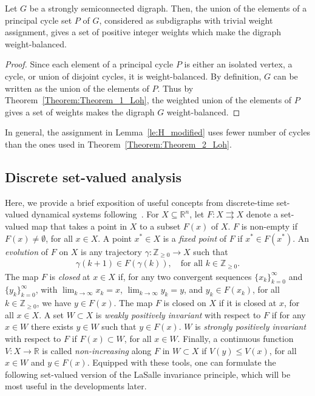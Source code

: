 \documentclass[final]{siamltex}
\begin{document}
\begin{lemma}\label{le:H_modified}
  Let $G$ be a strongly semiconnected digraph. Then, the union of the
  elements of a principal cycle set $P$ of $G$, considered as
  subdigraphs with trivial weight assignment, gives a set of positive
  integer weights which make the digraph weight-balanced.
\end{lemma}
\begin{proof}
  Since each element of a principal cycle $P$ is either an isolated
  vertex, a cycle, or union of disjoint cycles, it is
  weight-balanced. By definition, $G$ can be written as the union of
  the elements of $P$.  Thus by Theorem~\ref{Theorem:Theorem_1_Loh},
  the weighted union of the elements of $P$ gives a set of weights
  makes the digraph $G$ weight-balanced.
\end{proof}

In general, the assignment in Lemma~\ref{le:H_modified} uses fewer
number of cycles than the ones used in
Theorem~\ref{Theorem:Theorem_2_Loh}.

\subsection{Discrete set-valued analysis}

Here, we provide a brief exposition of useful concepts from
discrete-time set-valued dynamical systems
following~\cite{DGL:84,FB-JC-SM:08cor}. For $ X \subseteq
\mathbb{R}^n$, let ${{F}:{X} {\rightrightarrows} {X}}$ denote a set-valued map that
takes a point in $X$ to a subset $F(x)$ of $X$. $F$ is non-empty if $
F(x) \neq \emptyset$, for all $ x \in X $.  A point $ x^* \in X $ is a
\emph{fixed point} of $ F $ if $ x^* \in F(x^*) $.  An
\emph{evolution} of $ F $ on $ X $ is any trajectory $ \gamma:
\mathbb{Z}_{\geq0} \rightarrow X $ such that
\begin{align*}
  \gamma(k+1)\in F(\gamma(k)) , \quad \text{for all } k \in
  \mathbb{Z}_{\geq0} .
\end{align*}
The map $ F $ is \emph{closed} at $ x \in X $ if, for any two
convergent sequences $ \{x_k\}_{k=0}^{\infty} $ and
$\{y_k\}_{k=0}^{\infty} $, with $ \lim_{k\rightarrow \infty} x_k =x$,
$ \lim_{k\rightarrow \infty} y_k =y$, and $ y_k \in F(x_k) $, for all
$ k \in \mathbb{Z}_{\geq0} $, we have $ y \in F(x) $.  The map $F$ is
closed on $X$ if it is closed at $x$, for all $x \in X$.
A set $ W \subset X $ is \emph{weakly positively invariant} with
respect to $ F $ if for any $ x \in W $ there exists $ y \in W $ such
that $ y \in F(x) $. $ W $ is \emph{strongly positively invariant}
with respect to $ F $ if $ F(x) \subset W $, for all $ x \in W $.
Finally, a continuous function $ V: X\rightarrow \mathbb{R} $ is
called \emph{non-increasing} along $ F $ in $ W \subset X $ if $
V(y)\leq V(x) $, for all $ x \in W $ and $ y \in F(x) $.  Equipped
with these tools, one can formulate the following set-valued version
of the LaSalle invariance principle, which will be most useful in the
developments later.
\end{document}

